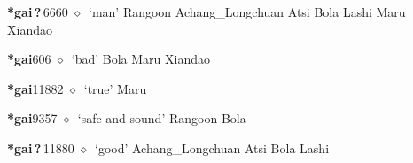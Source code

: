   \begin{list}{}{\leftmargin=1.5em \itemindent=-1.5em}
  \item {\footnotesize \textbf{*gai\,?\,}}{\tiny 6660}
         $\diamond$~`man'
         Rangoon 
\hspace{1ex}
         Achang\_Longchuan 
\hspace{1ex}
         Atsi 
\hspace{1ex}
         Bola 
\hspace{1ex}
         Lashi 
\hspace{1ex}
         Maru 
\hspace{1ex}
         Xiandao 
  \item {\footnotesize \textbf{*gai}}{\tiny 606}
\hspace{1ex}
         $\diamond$~`bad'
         Bola 
\hspace{1ex}
         Maru 
\hspace{1ex}
         Xiandao 
  \item {\footnotesize \textbf{*gai}}{\tiny 11882}
\hspace{1ex}
         $\diamond$~`true'
         Maru 
  \item {\footnotesize \textbf{*gai}}{\tiny 9357}
\hspace{1ex}
         $\diamond$~`safe and sound'
         Rangoon 
\hspace{1ex}
         Bola 
  \item {\footnotesize \textbf{*gai\,?\,}}{\tiny 11880}
\hspace{1ex}
         $\diamond$~`good'
         Achang\_Longchuan 
\hspace{1ex}
         Atsi 
\hspace{1ex}
         Bola 
\hspace{1ex}
         Lashi 
\hspace{1ex}

\end{list}
